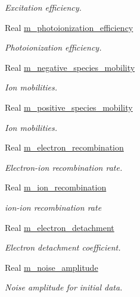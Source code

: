 \begin{DoxyCompactItemize}
\begin{DoxyCompactList}\small\item\em Excitation efficiency. \end{DoxyCompactList}\item 
Real \hyperlink{classair__bolsig_a67d63202a4409d315593c848f6fa3756}{m\+\_\+photoionization\+\_\+efficiency}
\begin{DoxyCompactList}\small\item\em Photoionization efficiency. \end{DoxyCompactList}\item 
Real \hyperlink{classair__bolsig_a3347b6d67c7584617ebfabb1e6fc4df7}{m\+\_\+negative\+\_\+species\+\_\+mobility}
\begin{DoxyCompactList}\small\item\em Ion mobilities. \end{DoxyCompactList}\item 
Real \hyperlink{classair__bolsig_a94cb53186e073ba5a255b2e2a65e6008}{m\+\_\+positive\+\_\+species\+\_\+mobility}
\begin{DoxyCompactList}\small\item\em Ion mobilities. \end{DoxyCompactList}\item 
Real \hyperlink{classair__bolsig_a5b0fc458ce803263f9ca25c19a68c5be}{m\+\_\+electron\+\_\+recombination}
\begin{DoxyCompactList}\small\item\em Electron-\/ion recombination rate. \end{DoxyCompactList}\item 
Real \hyperlink{classair__bolsig_a439659d260a21164d5a30c2b5e6b7fa7}{m\+\_\+ion\+\_\+recombination}
\begin{DoxyCompactList}\small\item\em ion-\/ion recombination rate \end{DoxyCompactList}\item 
Real \hyperlink{classair__bolsig_a447de9cb37db42cfc15e1b1489f88d64}{m\+\_\+electron\+\_\+detachment}
\begin{DoxyCompactList}\small\item\em Electron detachment coefficient. \end{DoxyCompactList}\item 
Real \hyperlink{classair__bolsig_ae36aece9648fe731145d7485bafed90e}{m\+\_\+noise\+\_\+amplitude}
\begin{DoxyCompactList}\small\item\em Noise amplitude for initial data. \end{DoxyCompactList}\item 

\end{DoxyCompactItemize}
